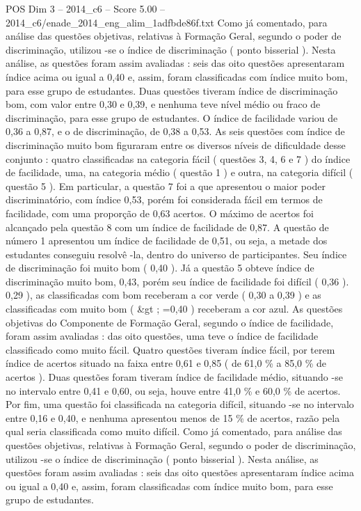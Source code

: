\begin{textsample}{POS Dim 3 – 2014\_c6 – Score 5.00 – 2014\_c6/enade\_2014\_eng\_alim\_1adfbde86f.txt}
Como já comentado, para análise das questões objetivas, relativas à Formação Geral, segundo o poder de discriminação, utilizou -se o índice de discriminação ( ponto bisserial ).
Nesta análise, as questões foram assim avaliadas : seis das oito questões apresentaram índice acima ou igual a 0,40 e, assim, foram classificadas com índice muito bom, para esse grupo de estudantes.
Duas questões tiveram índice de discriminação bom, com valor entre 0,30 e 0,39, e nenhuma teve nível médio ou fraco de discriminação, para esse grupo de estudantes.
O índice de facilidade variou de 0,36 a 0,87, e o de discriminação, de 0,38 a 0,53.
As seis questões com índice de discriminação muito bom figuraram entre os diversos níveis de dificuldade desse conjunto : quatro classificadas na categoria fácil ( questões 3, 4, 6 e 7 ) do índice de facilidade, uma, na categoria médio ( questão 1 ) e outra, na categoria difícil ( questão 5 ).
Em particular, a questão 7 foi a que apresentou o maior poder discriminatório, com índice 0,53, porém foi considerada fácil em termos de facilidade, com uma proporção de 0,63 acertos.
O máximo de acertos foi alcançado pela questão 8 com um índice de facilidade de 0,87.
A questão de número 1 apresentou um índice de facilidade de 0,51, ou seja, a metade dos estudantes conseguiu resolvê -la, dentro do universo de participantes.
Seu índice de discriminação foi muito bom ( 0,40 ).
Já a questão 5 obteve índice de discriminação muito bom, 0,43, porém seu índice de facilidade foi difícil ( 0,36 ). 0,29 ), as classificadas com bom receberam a cor verde ( 0,30 a 0,39 ) e as classificadas com muito bom ( \&gt ; =0,40 ) receberam a cor azul.
As questões objetivas do Componente de Formação Geral, segundo o índice de facilidade, foram assim avaliadas : das oito questões, uma teve o índice de facilidade classificado como muito fácil.
Quatro questões tiveram índice fácil, por terem índice de acertos situado na faixa entre 0,61 e 0,85 ( de 61,0 \% a 85,0 \% de acertos ).
Duas questões foram tiveram índice de facilidade médio, situando -se no intervalo entre 0,41 e 0,60, ou seja, houve entre 41,0 \% e 60,0 \% de acertos.
Por fim, uma questão foi classificada na categoria difícil, situando -se no intervalo entre 0,16 e 0,40, e nenhuma apresentou menos de 15 \% de acertos, razão pela qual seria classificada como muito difícil.
Como já comentado, para análise das questões objetivas, relativas à Formação Geral, segundo o poder de discriminação, utilizou -se o índice de discriminação ( ponto bisserial ).
Nesta análise, as questões foram assim avaliadas : seis das oito questões apresentaram índice acima ou igual a 0,40 e, assim, foram classificadas com índice muito bom, para esse grupo de estudantes.

\end{textsample}

